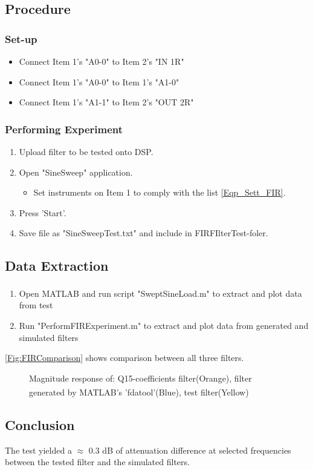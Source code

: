 \subsection{Procedure}
\subsubsection{Set-up}
	\begin{itemize}
		\item Connect Item 1's "A0-0" to Item 2's "IN 1R"
		\item Connect Item 1's "A0-0" to Item 1's "A1-0"
		\item Connect Item 1's "A1-1" to Item 2's "OUT 2R"
	\end{itemize}

\subsubsection{Performing Experiment}
	\begin{enumerate}
		\item Upload filter to be tested onto DSP.
		\item Open "SineSweep" application.
		\begin{itemize}
			 \item Set instruments on Item 1 to comply with the list \autoref{Eqp_Sett_FIR}.
		\end{itemize}
		\item Press 'Start'.
		\item Save file as "SineSweepTest.txt" and include in FIRFIlterTest-foler.
	\end{enumerate}


\subsection{Data Extraction}
	\begin{enumerate}
		\item Open MATLAB\textsuperscript{\textregistered} and run script "SweptSineLoad.m" to extract and plot data from test
		\item Run "PerformFIRExperiment.m" to extract and plot data from generated and simulated filters
	\end{enumerate}

\autoref{Fig:FIRComparison} shows comparison between all three filters.
	
\begin{figure}[H]
	\centering
	
	\caption{Magnitude response of: Q15-coefficients filter(Orange), filter generated by MATLAB\textsuperscript{\textregistered}'s 'fdatool'(Blue), test filter(Yellow)}
	\label{Fig:FIRComparison}
\end{figure}

\subsection{Conclusion}
The test yielded a $\approx$ 0.3 dB of attenuation difference  at selected frequencies between the tested filter and the simulated filters.



